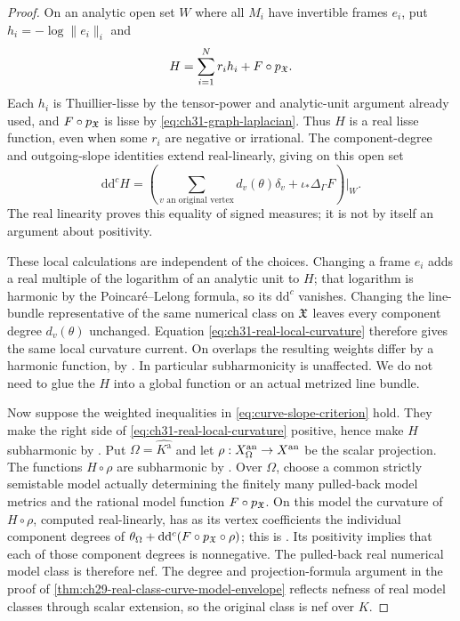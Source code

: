\begin{proof}
On an analytic open set \(W\) where all \(M_i\) have invertible frames \(e_i\),
put \(h_i=-\log\lVert e_i\rVert_i\) and
\[
                  H=\sum_{i=1}^N r_i h_i+F\circ p_{\mathfrak X}.
\]
Each \(h_i\) is Thuillier-lisse by the tensor-power and analytic-unit
argument already used, and \(F\circ p_{\mathfrak X}\) is lisse by
\eqref{eq:ch31-graph-laplacian}.  Thus \(H\) is a real lisse function,
even when some \(r_i\) are negative or irrational.
The component-degree and outgoing-slope identities extend
real-linearly, giving on this open set
\begin{equation}
\label{eq:ch31-real-local-curvature}
 \mathrm d\mathrm d^cH
  =\left(\sum_{v\text{ an original vertex}}
                 d_v(\theta)\delta_v
                       +\iota_*\Delta_\Gamma F\right)\bigg|_W.
\end{equation}
The real linearity proves this equality of signed measures;
it is not by itself an argument about positivity.

These local calculations are independent of the choices.
Changing a frame \(e_i\) adds a real multiple of the logarithm
of an analytic unit to \(H\); that logarithm is harmonic by the
Poincar\'e--Lelong formula, so its
\(\mathrm d\mathrm d^c\) vanishes.
Changing the line-bundle representative of the same numerical class
on \(\mathfrak X\) leaves every component degree \(d_v(\theta)\) unchanged.
Equation \eqref{eq:ch31-real-local-curvature} therefore gives the
same local curvature current.  On overlaps the resulting weights
differ by a harmonic function, by \cite[Lemma~3.3.12]{Thu05}.
In particular subharmonicity is unaffected.  We do not need to
glue the \(H\) into a global function or an actual metrized line bundle.

Now suppose the weighted inequalities in
\eqref{eq:curve-slope-criterion} hold.  They make the right side of
\eqref{eq:ch31-real-local-curvature} positive, hence make \(H\)
subharmonic by \cite[Theorem~3.4.12(ii)]{Thu05}.
Put \(\Omega=\widehat{K^{\mathrm a}}\) and let
\(\rho:X_\Omega^{\mathrm{an}}\to X^{\mathrm{an}}\) be the scalar projection.
The functions \(H\circ\rho\) are subharmonic by
\cite[Corollary~3.4.5]{Thu05}.
Over \(\Omega\), choose a common strictly semistable model actually
determining the finitely many pulled-back model metrics and the
rational model function \(F\circ p_{\mathfrak X}\).
On this model the curvature of \(H\circ\rho\), computed real-linearly,
has as its vertex coefficients the individual component degrees of
\(\theta_\Omega+\mathrm d\mathrm d^c(F\circ p_{\mathfrak X}\circ\rho)\);
this is \cite[Proposition~3.7]{GJKM19}.
Its positivity implies that each of those component degrees is
nonnegative.  The pulled-back real numerical model class is therefore
nef.  The degree and projection-formula argument in the proof of
\cref{thm:ch29-real-class-curve-model-envelope} reflects nefness
of real model classes through scalar extension, so the original
class is nef over \(K\).


\end{proof}
